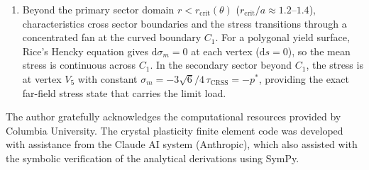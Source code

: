\documentclass{svjour3} %
\newcommand{\diff}{\mathrm{d}}
\newcommand{\tcrss}{\tau_{\mathrm{CRSS}}}
\newcommand{\sm}{\sigma_m}
\begin{document}
\begin{enumerate}
\item Beyond the primary sector domain
$r < r_{\mathrm{crit}}(\theta)$ ($r_{\mathrm{crit}}/a \approx
1.2$--$1.4$), characteristics cross sector boundaries and the stress
transitions through a concentrated fan at the curved boundary $C_1$.
For a polygonal yield surface, Rice's Hencky equation gives
$\diff\sm = 0$ at each vertex ($\diff s = 0$), so the mean stress
is continuous across $C_1$. In the secondary sector beyond $C_1$,
the stress is at vertex $V_5$ with constant
$\sm = -3\sqrt{6}/4\,\tcrss = -p^*$, providing the exact far-field
stress state that carries the limit load.
\end{enumerate}

\begin{acknowledgements}
The author gratefully acknowledges the computational resources provided
by Columbia University. The crystal plasticity finite element code was
developed with assistance from the Claude AI system (Anthropic), which
also assisted with the symbolic verification of the analytical
derivations using SymPy.
\end{acknowledgements}
\end{document}
